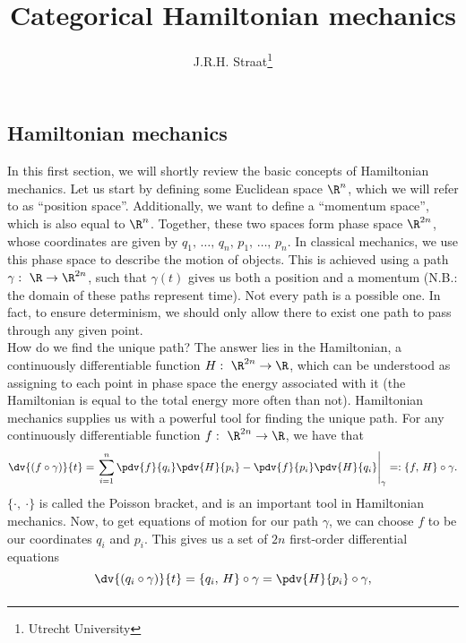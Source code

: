 \documentclass{article}
\title{Categorical Hamiltonian mechanics}
\author{J.R.H. Straat\thanks{Utrecht University}}
\date{}
\begin{document}
\maketitle

\begin{multicols}{2}
	\section{Hamiltonian mechanics}
	In this first section, we will shortly review the basic concepts of Hamiltonian mechanics. Let us start by defining some Euclidean space \(\R^n\), which we will refer to as ``position space''. Additionally, we want to define a ``momentum space'', which is also equal to \(\R^n\).
	Together, these two spaces form phase space \(\R^{2n}\), whose coordinates are given by \(q_1,\,\dots,\,q_n,\,p_1,\,\dots,\,p_n\). In classical mechanics, we use this phase space to describe the motion of objects. This is achieved using a path \(\gamma:\ \R\to\R^{2n}\), such that \(\gamma(t)\) gives us both a position and a momentum (N.B.: the domain of these paths represent time).
	Not every path is a possible one. In fact, to ensure determinism, we should only allow there to exist one path to pass through any given point.\\
	How do we find the unique path? The answer lies in the Hamiltonian, a continuously differentiable function \(H:\ \R^{2n}\to\R\), which can be understood as assigning to each point in phase space the energy associated with it (the Hamiltonian is equal to the total energy more often than not).
	Hamiltonian mechanics supplies us with a powerful tool for finding the unique path. For any continuously differentiable function \(f:\ \R^{2n}\to\R\), we have that
	\begin{equation}
		\dv{(f\circ\gamma)}{t} = \left.\sum_{i=1}^n \pdv{f}{q_i}\pdv{H}{p_i} - \pdv{f}{p_i}\pdv{H}{q_i}\right|_{\gamma} =: \{f,\,H\}\circ\gamma.
	\end{equation}
	\(\{\cdot,\ \cdot\}\) is called the Poisson bracket, and is an important tool in Hamiltonian mechanics.
	Now, to get equations of motion for our path \(\gamma\), we can choose \(f\) to be our coordinates \(q_i\) and \(p_i\). This gives us a set of \(2n\) first-order differential equations
	\begin{equation}
		\dv{(q_i\circ\gamma)}{t} = \{q_i,\,H\}\circ\gamma = \pdv{H}{p_i}\circ\gamma,
	\end{equation}
	\begin{equation}

\end{equation}
\end{multicols}
\end{document}
